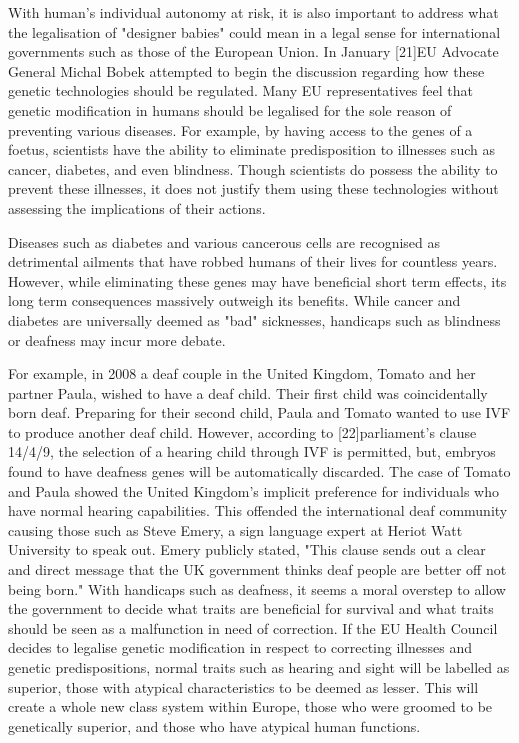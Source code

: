    With human's individual autonomy at risk, it is also important to
   address what the legalisation of "designer babies" could mean in a
   legal sense for international governments such as those of the European
   Union. In January  [21]EU Advocate General Michal Bobek attempted to
   begin the discussion regarding how these genetic technologies should be
   regulated. Many EU representatives feel that genetic modification in
   humans should be legalised for the sole reason of preventing various
   diseases. For example, by having access to the genes of a foetus,
   scientists have the ability to eliminate predisposition to illnesses
   such as cancer, diabetes, and even blindness. Though scientists do
   possess the ability to prevent these illnesses, it does not justify
   them using these technologies without assessing the implications of
   their actions.

   Diseases such as diabetes and various cancerous cells are recognised as
   detrimental ailments that have robbed humans of their lives for
   countless years. However, while eliminating these genes may have
   beneficial short term effects, its long term consequences massively
   outweigh its benefits. While cancer and diabetes are universally deemed
   as "bad" sicknesses, handicaps such as blindness or deafness may incur
   more debate.

   For example, in 2008 a deaf couple in the United Kingdom, Tomato and
   her partner Paula, wished to have a deaf child. Their first child was
   coincidentally born deaf. Preparing for their second child, Paula and
   Tomato wanted to use IVF to produce another deaf child. However,
   according to [22]parliament's clause 14/4/9, the selection of a hearing
   child through IVF is permitted, but, embryos found to have deafness
   genes will be automatically discarded. The case of Tomato and Paula
   showed the United Kingdom's implicit preference for individuals who
   have normal hearing capabilities. This offended the international deaf
   community causing those such as Steve Emery, a sign language expert at
   Heriot Watt University to speak out. Emery publicly stated, "This
   clause sends out a clear and direct message that the UK government
   thinks deaf people are better off not being born." With handicaps such
   as deafness, it seems a moral overstep to allow the government to
   decide what traits are beneficial for survival and what traits should
   be seen as a malfunction in need of correction. If the EU Health
   Council decides to legalise genetic modification in respect to
   correcting illnesses and genetic predispositions, normal traits such as
   hearing and sight will be labelled as superior, those with atypical
   characteristics to be deemed as lesser. This will create a whole new
   class system within Europe, those who were groomed to be genetically
   superior, and those who have atypical human functions.


